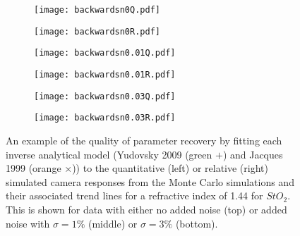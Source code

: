 \begin{figure}[h!]
    \centering
    \begin{subfigure}{0.49\textwidth}
        \texttt{[image: backwardsn0Q.pdf]}
        \caption{}
        \label{fig:backwardsn0Q}
    \end{subfigure}
    \begin{subfigure}{0.49\textwidth}
        \texttt{[image: backwardsn0R.pdf]}
        \caption{}
        \label{fig:backwardsn0R}
    \end{subfigure}
    \begin{subfigure}{0.49\textwidth}
        \texttt{[image: backwardsn0.01Q.pdf]}
        \caption{}
        \label{fig:backwardsn0.01Q}
    \end{subfigure}
    \begin{subfigure}{0.49\textwidth}
        \texttt{[image: backwardsn0.01R.pdf]}
        \caption{}
        \label{fig:backwardsm0.01R}
    \end{subfigure}
    \begin{subfigure}{0.49\textwidth}
        \texttt{[image: backwardsn0.03Q.pdf]}
        \caption{}
        \label{fig:backwardsn0.03Q}
    \end{subfigure}
    \begin{subfigure}{0.49\textwidth}
        \texttt{[image: backwardsn0.03R.pdf]}
        \caption{}
        \label{fig:backwardsm0.03R}
    \end{subfigure}
    \caption{An example of the quality of parameter recovery by fitting each inverse analytical model (Yudovsky 2009 (\textcolor{MyGreen}{green $+$}) and Jacques 1999 (\textcolor{MyOrange}{orange $\times$})) to the quantitative (left) or relative (right) simulated camera responses from the Monte Carlo simulations and their associated trend lines for a refractive index of 1.44 for $StO_2$. This is shown for data with either no added noise (top) or added noise with $\sigma = 1\%$ (middle) or $\sigma = 3\%$ (bottom).}
    \label{fig:backwardsHSIMC1}
\end{figure}

